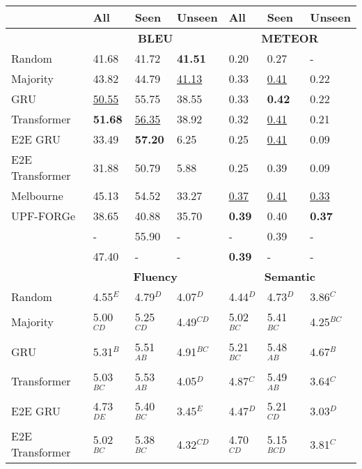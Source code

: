 \documentclass[11pt,a4paper]{article}
\begin{document}
\begin{table*}
\centering
\footnotesize{
\begin{tabular}{l l l l l l l}
\toprule
                         & \textbf{All} & \textbf{Seen} & \textbf{Unseen} & \textbf{All} & \textbf{Seen} & \textbf{Unseen} \\
\midrule
  & \multicolumn{3}{c}{\bf BLEU} & \multicolumn{3}{c}{\bf METEOR} \\
\midrule
Random          & 41.68 & 41.72 & \bf{41.51} & 0.20 & 0.27 & - \\
Majority        & 43.82 & 44.79 & \underline{41.13} & 0.33 & \underline{0.41} & 0.22 \\
GRU             & \underline{50.55} & 55.75 & 38.55 & 0.33 & \bf{0.42} & 0.22 \\
Transformer     & \bf{51.68} & \underline{56.35} & 38.92 & 0.32 & \underline{0.41} & 0.21 \\
E2E GRU         & 33.49 & \bf{57.20} &  6.25 & 0.25 & \underline{0.41} & 0.09 \\
E2E Transformer & 31.88 & 50.79 &  5.88 & 0.25 & 0.39 & 0.09 \\
Melbourne       & 45.13 & 54.52 & 33.27 & \underline{0.37} & \underline{0.41} & \underline{0.33} \\
UPF-FORGe       & 38.65 & 40.88 & 35.70 & \bf{0.39} & 0.40 & \bf{0.37} \\
\cite{marcheggiani2018} & - & 55.90 & - & - & 0.39 & - \\
\cite{amit2019} & 47.40 & - & - & \bf{0.39} & - & - \\
\midrule
\midrule
  & \multicolumn{3}{c}{\bf Fluency} & \multicolumn{3}{c}{\bf Semantic} \\
\midrule
Random          & 4.55$^{E}$  & 4.79$^{D}$  & 4.07$^{D}$  & 4.44$^{D}$  & 4.73$^{D}$   & 3.86$^{C}$ \\
Majority        & 5.00$^{CD}$ & 5.25$^{CD}$ & 4.49$^{CD}$ & 5.02$^{BC}$ & 5.41$^{BC}$  & 4.25$^{BC}$ \\
GRU             & 5.31$^{B}$  & 5.51$^{AB}$ & 4.91$^{BC}$ & 5.21$^{BC}$ & 5.48$^{AB}$  & 4.67$^{B}$ \\
Transformer     & 5.03$^{BC}$ & 5.53$^{AB}$ & 4.05$^{D}$  & 4.87$^{C}$  & 5.49$^{AB}$  & 3.64$^{C}$ \\
E2E GRU         & 4.73$^{DE}$ & 5.40$^{BC}$ & 3.45$^{E}$  & 4.47$^{D}$  & 5.21$^{CD}$  & 3.03$^{D}$ \\
E2E Transformer & 5.02$^{BC}$ & 5.38$^{BC}$ & 4.32$^{CD}$ & 4.70$^{CD}$ & 5.15$^{BCD}$ & 3.81$^{C}$ \\

\end{tabular}}
\end{table*}
\end{document}
